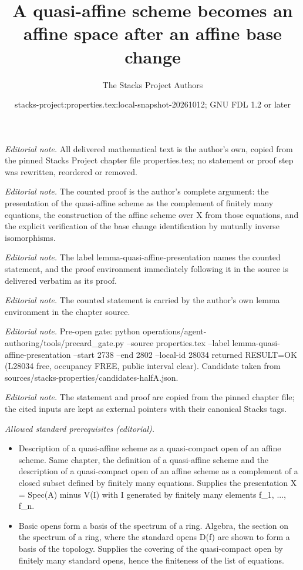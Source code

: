 \documentclass[10pt,a4paper]{amsart}
\title{A quasi-affine scheme becomes an affine space after an affine base change}
\author{The Stacks Project Authors}
\date{stacks-project:properties.tex:local-snapshot-20261012; GNU FDL 1.2 or later}
\theoremstyle{plain}
\theoremstyle{definition}
\theoremstyle{remark}
\numberwithin{equation}{subsection}
\begin{document}
\maketitle
\noindent\textit{Editorial note.} All delivered mathematical text is the author's own, copied from the pinned Stacks Project chapter file properties.tex; no statement or proof step was rewritten, reordered or removed.\par\medskip
\noindent\textit{Editorial note.} The counted proof is the author's complete argument: the presentation of the quasi-affine scheme as the complement of finitely many equations, the construction of the affine scheme over X from those equations, and the explicit verification of the base change identification by mutually inverse isomorphisms.\par\medskip
\noindent\textit{Editorial note.} The label lemma-quasi-affine-presentation names the counted statement, and the proof environment immediately following it in the source is delivered verbatim as its proof.\par\medskip
\noindent\textit{Editorial note.} The counted statement is carried by the author's own lemma environment in the chapter source.\par\medskip
\noindent\textit{Editorial note.} Pre-open gate: python operations/agent-authoring/tools/precard\_gate.py --source properties.tex --label lemma-quasi-affine-presentation --start 2738 --end 2802 --local-id 28034 returned RESULT=OK (L28034 free, occupancy FREE, public interval clear). Candidate taken from sources/stacks-properties/candidates-halfA.json.\par\medskip
\noindent\textit{Editorial note.} The statement and proof are copied from the pinned chapter file; the cited inputs are kept as external pointers with their canonical Stacks tags.\par\medskip
\noindent\textit{Allowed standard prerequisites (editorial).}\begin{itemize}
\item Description of a quasi-affine scheme as a quasi-compact open of an affine scheme. Same chapter, the definition of a quasi-affine scheme and the description of a quasi-compact open of an affine scheme as a complement of a closed subset defined by finitely many equations. Supplies the presentation X = Spec(A) minus V(I) with I generated by finitely many elements f\_1, ..., f\_n.
\item Basic opens form a basis of the spectrum of a ring. Algebra, the section on the spectrum of a ring, where the standard opens D(f) are shown to form a basis of the topology. Supplies the covering of the quasi-compact open by finitely many standard opens, hence the finiteness of the list of equations.
\end{itemize}\medskip
\end{document}
